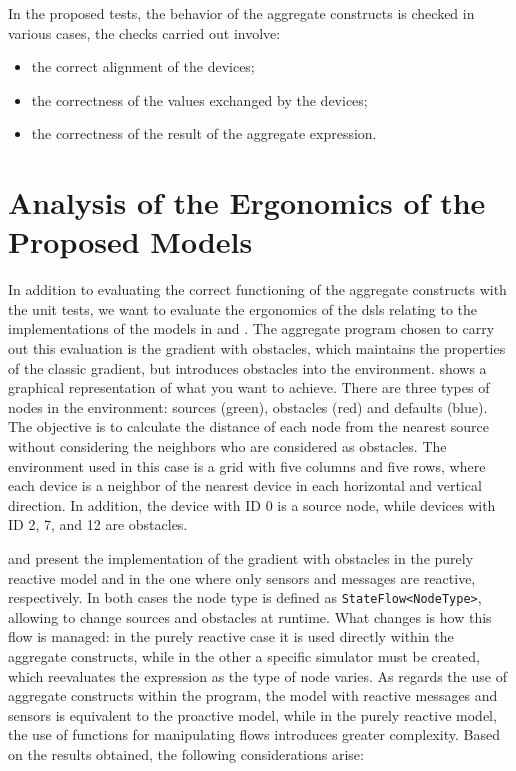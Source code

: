 

In the proposed tests, the behavior of the aggregate constructs is checked in various cases, the checks carried out involve:

\begin{itemize}
    \item the correct alignment of the devices;
    \item the correctness of the values exchanged by the devices;
    \item the correctness of the result of the aggregate expression.
\end{itemize}

\section{Analysis of the Ergonomics of the Proposed Models}

In addition to evaluating the correct functioning of the aggregate constructs with the unit tests, we want to evaluate the ergonomics of the \acp{dsl} relating to the implementations of the models in  and . The aggregate program chosen to carry out this evaluation is the gradient with obstacles, which maintains the properties of the classic gradient, but introduces obstacles into the environment.  shows a graphical representation of what you want to achieve. There are three types of nodes in the environment: sources (green), obstacles (red) and defaults (blue). The objective is to calculate the distance of each node from the nearest source without considering the neighbors who are considered as obstacles. The environment used in this case is a grid with five columns and five rows, where each device is a neighbor of the nearest device in each horizontal and vertical direction. In addition, the device with ID 0 is a source node, while devices with ID 2, 7, and 12 are obstacles.

 and  present the implementation of the gradient with obstacles in the purely reactive model and in the one where only sensors and messages are reactive, respectively. In both cases the node type is defined as \texttt{StateFlow<NodeType>}, allowing to change sources and obstacles at runtime. What changes is how this flow is managed: in the purely reactive case it is used directly within the aggregate constructs, while in the other a specific simulator must be created, which reevaluates the expression as the type of node varies. As regards the use of aggregate constructs within the program, the model with reactive messages and sensors is equivalent to the proactive model, while in the purely reactive model, the use of functions for manipulating flows introduces greater complexity. Based on the results obtained, the following considerations arise:


